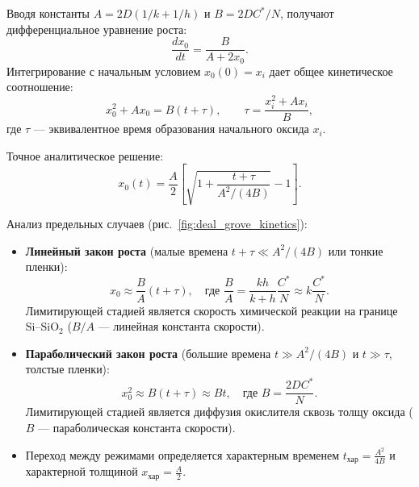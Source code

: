 \documentclass[12pt,a4paper]{article}
\theoremstyle{plain}
\theoremstyle{definition}
\theoremstyle{remark}
\numberwithin{equation}{section}
\begin{document}
Вводя константы $A = 2D(1/k + 1/h)$ и $B = 2DC^*/N$, получают дифференциальное уравнение роста:
\begin{equation}
    \frac{dx_0}{dt} = \frac{B}{A + 2x_0}.
\end{equation}
Интегрирование с начальным условием $x_0(0) = x_i$ дает общее кинетическое соотношение:
\begin{equation}
    x_0^2 + Ax_0 = B(t + \tau), \qquad \tau = \frac{x_i^2 + Ax_i}{B},
\end{equation}
где $\tau$ — эквивалентное время образования начального оксида $x_i$.

Точное аналитическое решение:
\begin{equation}
    x_0(t) = \frac{A}{2} \left[ \sqrt{1 + \frac{t + \tau}{A^2/(4B)}} - 1 \right].
\end{equation}

Анализ предельных случаев (рис.~\ref{fig:deal_grove_kinetics}):
\begin{itemize}
    \item \textbf{Линейный закон роста} (малые времена $t + \tau \ll A^2/(4B)$ или тонкие пленки):
    \begin{equation}
        x_0 \approx \frac{B}{A}(t + \tau), \quad \text{где } \frac{B}{A} = \frac{k h}{k + h} \frac{C^*}{N} \approx k \frac{C^*}{N}.
    \end{equation}
    Лимитирующей стадией является скорость химической реакции на границе $\mathrm{Si}\text{--}\mathrm{SiO}_2$ ($B/A$ — линейная константа скорости).
    \item \textbf{Параболический закон роста} (большие времена $t \gg A^2/(4B)$ и $t \gg \tau$, толстые пленки):
    \begin{equation}
        x_0^2 \approx B(t + \tau) \approx Bt, \quad \text{где } B = \frac{2DC^*}{N}.
    \end{equation}
    Лимитирующей стадией является диффузия окислителя сквозь толщу оксида ($B$ — параболическая константа скорости).
    \item Переход между режимами определяется характерным временем $t_\text{хар} = \frac{A^2}{4B}$ и характерной толщиной $x_\text{хар} = \frac{A}{2}$.
\end{itemize}
\end{document}
